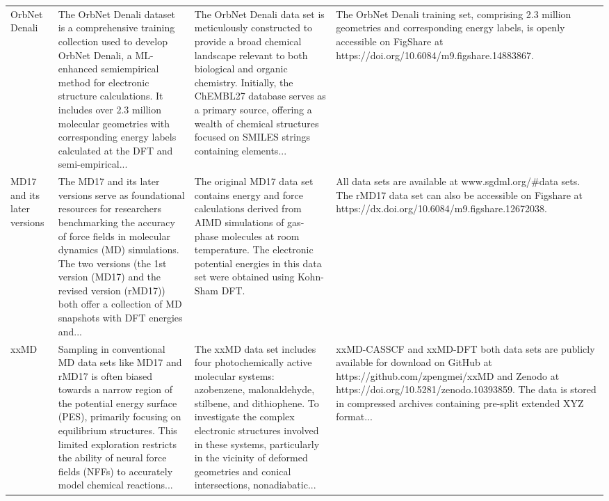 \documentclass[12pt]{article}
\begin{document}
\begin{longtable}{p{}p{}p{}p{}}
OrbNet Denali \cite{ds19-7} & The OrbNet Denali dataset is a comprehensive training collection used to develop OrbNet Denali, a ML-enhanced semiempirical method for electronic structure calculations. It includes over 2.3 million molecular geometries with corresponding energy labels calculated at the DFT and semi-empirical... & The OrbNet Denali data set is meticulously constructed to provide a broad chemical landscape relevant to both biological and organic chemistry. Initially, the ChEMBL27 database serves as a primary source, offering a wealth of chemical structures focused on SMILES strings containing elements... & The OrbNet Denali training set, comprising 2.3 million geometries and corresponding energy labels, is openly accessible on FigShare at https://doi.org/10.6084/m9.figshare.14883867. \cite{ds19-119} \\
MD17 and its later versions \cite{ds20-18} & The MD17 and its later versions serve as foundational resources for researchers benchmarking the accuracy of force fields in molecular dynamics (MD) simulations. The two versions (the 1st version (MD17) and the revised version (rMD17)) both offer a collection of MD snapshots with DFT energies and... & The original MD17 data set contains energy and force calculations derived from AIMD simulations of gas-phase molecules at room temperature. The electronic potential energies in this data set were obtained using Kohn-Sham DFT. & All data sets are available at www.sgdml.org/\#data sets. The rMD17 data set can also be accessible on Figshare at https://dx.doi.org/10.6084/m9.figshare.12672038. \cite{ds20-121,ds20-122} \\
xxMD \cite{ds21-51} & Sampling in conventional MD data sets like MD17 and rMD17 is often biased towards a narrow region of the potential energy surface (PES), primarily focusing on equilibrium structures. This limited exploration restricts the ability of neural force fields (NFFs) to accurately model chemical reactions... & The xxMD data set includes four photochemically active molecular systems: azobenzene, malonaldehyde, stilbene, and dithiophene. To investigate the complex electronic structures involved in these systems, particularly in the vicinity of deformed geometries and conical intersections, nonadiabatic... & xxMD-CASSCF and xxMD-DFT both data sets are publicly available for download on GitHub at https://github.com/zpengmei/xxMD and Zenodo at https://doi.org/10.5281/zenodo.10393859. The data is stored in compressed archives containing pre-split extended XYZ format... \cite{ds21-129} \\

\end{longtable}
\end{document}
